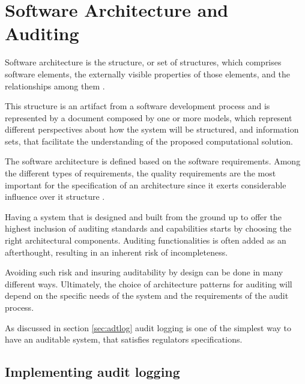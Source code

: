 %
\chapter{Software Architecture and Auditing}\label{chap:sadt}

Software architecture is the structure, or set of structures, which comprises software elements, the externally visible properties of those elements, and the relationships among them \citep{SAIP}. 

This structure is an artifact from a software development process and is represented by a document composed by one or more models, which represent different perspectives about how the system will be structured, and information sets, that facilitate the understanding of the proposed computational solution. 

The software architecture is defined based on the software requirements. Among the different types of requirements, the quality requirements are the most important for the specification of an architecture since it exerts considerable influence over it structure \citep{SAIP}.

Having a system that is designed and built from the ground up to offer the highest inclusion of auditing standards and capabilities starts by choosing the right architectural components. Auditing functionalities is often added as an afterthought, resulting in an inherent risk of incompleteness. 

Avoiding such risk and insuring auditability by design can be done in many different ways. Ultimately, the choice of architecture patterns for auditing will depend on the specific needs of the system and the requirements of the audit process.

As discussed in section \ref{sec:adtlog} audit logging is one of the simplest way to have an auditable system, that satisfies regulators specifications.



\section{Implementing audit logging}\label{sec:adtimpl}

